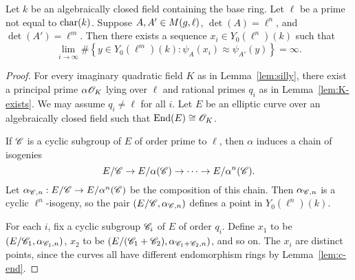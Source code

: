 \documentclass{amsart}
\begin{document}
\begin{lemma}\label{lem:lim-degree}
Let $k$ be an algebraically closed field containing the base ring.
  Let $\ell$ be a prime not equal to $\operatorname{char}(k)$. 
  Suppose $A,A' \in M(g,\ell)$, $\det(A) = \ell^n$, and $\det(A') = \ell^m$.
  Then there exists a sequence $x_i \in Y_0(\ell^n)(k)$ such that
  \[
    \lim_{i \to \infty}\#\left\{ y \in Y_0(\ell^m)(k) \colon \psi_A(x_i) \approx \psi_{A'}(y) \right\} = \infty.
  \]
\end{lemma}
\begin{proof}
  For every imaginary quadratic field $K$ as in Lemma~\ref{lem:silly}, there exist a principal prime $\alpha\mathscr{O}_K$ lying over $\ell$ and rational primes $q_i$ as in Lemma~\ref{lem:K-exists}. We may assume $q_i \neq \ell$ for all $i$. Let $E$ be an elliptic curve over an algebraically closed field such that $\operatorname{End}(E) \cong \mathscr{O}_K$.

  If $\mathscr{C}$ is a cyclic subgroup of $E$ of order prime to $\ell$, then $\alpha$ induces a chain of isogenies
  \[
    E/\mathscr{C} \to E/\alpha(\mathscr{C}) \to \cdots \to E/\alpha^n(\mathscr{C}).
  \]
  Let $\alpha_{\mathscr{C},n}: E/\mathscr{C} \to E/\alpha^n(\mathscr{C})$ be the composition of this chain. Then $\alpha_{\mathscr{C},n}$ is a cyclic $\ell^n$-isogeny, so the pair $(E/\mathscr{C},\alpha_{\mathscr{C},n})$ defines a point in $Y_0(\ell^n)(k)$.

    For each $i$, fix a cyclic subgroup $\mathscr{C}_i$ of $E$ of order $q_i$. Define $x_1$ to be $(E/\mathscr{C}_1,\alpha_{\mathscr{C}_1,n})$, $x_2$ to be $(E/(\mathscr{C}_1 + \mathscr{C}_2), \alpha_{\mathscr{C}_1 + \mathscr{C}_2,n})$, and so on. The $x_i$ are distinct points, since the curves all have different endomorphism rings by Lemma~\ref{lem:c-end}.


\end{proof}
\end{document}
